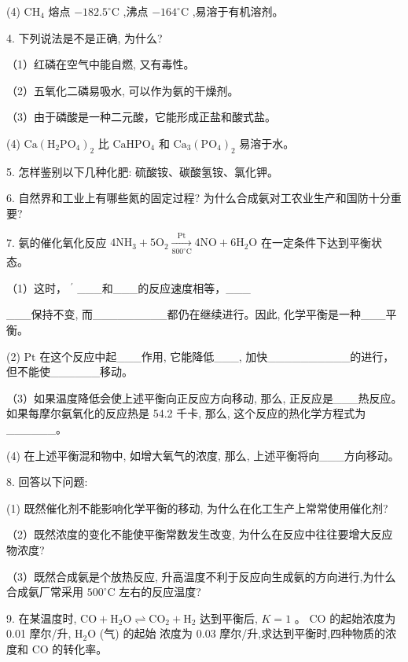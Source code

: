 \documentclass[10pt]{article}
\begin{document}
(4) \({\mathrm{{CH}}}_{4}\) 熔点 \(- {182.5}^{ \circ }\mathrm{C}\) ,沸点 \(- {164}^{ \circ }\mathrm{C}\) ,易溶于有机溶剂。

4. 下列说法是不是正确, 为什么?

（1）红磷在空气中能自燃, 又有毒性。

（2）五氧化二磷易吸水, 可以作为氨的干燥剂。

（3）由于磷酸是一种二元酸，它能形成正盐和酸式盐。

(4) \(\mathrm{{Ca}}{\left( {\mathrm{H}}_{2}{\mathrm{{PO}}}_{4}\right) }_{2}\) 比 \({\mathrm{{CaHPO}}}_{4}\) 和 \({\mathrm{{Ca}}}_{3}{\left( {\mathrm{{PO}}}_{4}\right) }_{2}\) 易溶于水。

5. 怎样鉴别以下几种化肥: 硫酸铵、碳酸氢铵、氯化钾。

6. 自然界和工业上有哪些氮的固定过程? 为什么合成氨对工农业生产和国防十分重要?

7. 氨的催化氧化反应 \(4{\mathrm{{NH}}}_{3} + 5{\mathrm{O}}_{2}\xrightarrow[{{800}^{ \circ }\mathrm{C}}]{\mathrm{{Pt}}}4\mathrm{{NO}} + 6{\mathrm{H}}_{2}\mathrm{O}\) 在一定条件下达到平衡状态。

（1）这时， \({}^{\prime }\) \_\_\_和\_\_\_的反应速度相等，\_\_\_

\_\_\_保持不变, 而\_\_\_\_\_\_\_\_\_都仍在继续进行。因此, 化学平衡是一种\_\_\_平衡。

(2) \(\mathrm{{Pt}}\) 在这个反应中起\_\_\_作用, 它能降低\_\_\_, 加快\_\_\_\_\_\_\_\_\_\_的进行，但不能使\_\_\_\_\_\_移动。

（3）如果温度降低会使上述平衡向正反应方向移动, 那么, 正反应是\_\_\_热反应。如果每摩尔氨氧化的反应热是 54.2 千卡, 那么, 这个反应的热化学方程式为\_\_\_\_\_\_。

(4) 在上述平衡混和物中, 如增大氧气的浓度, 那么, 上述平衡将向\_\_\_方向移动。

8. 回答以下问题:

(1) 既然催化剂不能影响化学平衡的移动, 为什么在化工生产上常常使用催化剂?

（2）既然浓度的变化不能使平衡常数发生改变, 为什么在反应中往往要增大反应物浓度?

（3）既然合成氨是个放热反应, 升高温度不利于反应向生成氨的方向进行,为什么合成氨厂常采用 \({500}^{ \circ }\mathrm{C}\) 左右的反应温度?

9. 在某温度时, \(\mathrm{{CO}} + {\mathrm{H}}_{2}\mathrm{O} \rightleftharpoons {\mathrm{{CO}}}_{2} + {\mathrm{H}}_{2}\) 达到平衡后, \(K = 1\) 。 \(\mathrm{{CO}}\) 的起始浓度为 0.01 摩尔/升, \({\mathrm{H}}_{2}\mathrm{O}\) (气) 的起始 浓度为 0.03 摩尔/升,求达到平衡时,四种物质的浓度和 \(\mathrm{{CO}}\) 的转化率。
\end{document}

